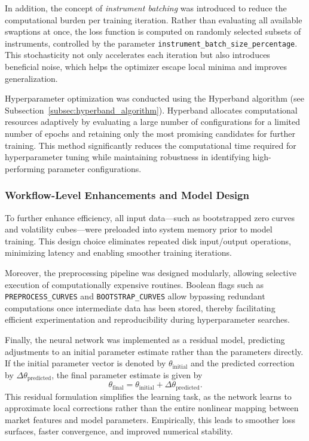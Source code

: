 {In addition, the concept of \textit{instrument batching} was introduced to reduce the computational burden per training iteration. Rather than evaluating all available swaptions at once, the loss function is computed on randomly selected subsets of instruments, controlled by the parameter \texttt{instrument\_batch\_size\_percentage}. This stochasticity not only accelerates each iteration but also introduces beneficial noise, which helps the optimizer escape local minima and improves generalization.

Hyperparameter optimization was conducted using the Hyperband algorithm (see Subsection~\ref{subsec:hyperband_algorithm}). Hyperband allocates computational resources adaptively by evaluating a large number of configurations for a limited number of epochs and retaining only the most promising candidates for further training. This method significantly reduces the computational time required for hyperparameter tuning while maintaining robustness in identifying high-performing parameter configurations.

\subsubsection{Workflow-Level Enhancements and Model Design}
To further enhance efficiency, all input data—such as bootstrapped zero curves and volatility cubes—were preloaded into system memory prior to model training. This design choice eliminates repeated disk input/output operations, minimizing latency and enabling smoother training iterations.

Moreover, the preprocessing pipeline was designed modularly, allowing selective execution of computationally expensive routines. Boolean flags such as \texttt{PREPROCESS\_CURVES} and \texttt{BOOTSTRAP\_CURVES} allow bypassing redundant computations once intermediate data has been stored, thereby facilitating efficient experimentation and reproducibility during hyperparameter searches.

Finally, the neural network was implemented as a residual model, predicting adjustments to an initial parameter estimate rather than the parameters directly. If the initial parameter vector is denoted by $\theta_{\text{initial}}$ and the predicted correction by $\Delta \theta_{\text{predicted}}$, the final parameter estimate is given by
\begin{equation}
	\theta_{\text{final}} = \theta_{\text{initial}} + \Delta \theta_{\text{predicted}}.
\end{equation}
This residual formulation simplifies the learning task, as the network learns to approximate local corrections rather than the entire nonlinear mapping between market features and model parameters. Empirically, this leads to smoother loss surfaces, faster convergence, and improved numerical stability.

}
